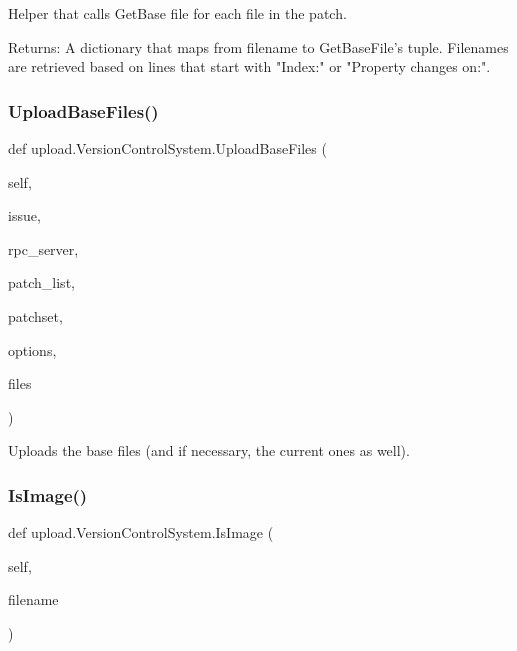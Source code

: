 \begin{DoxyVerb}Helper that calls GetBase file for each file in the patch.

Returns:
  A dictionary that maps from filename to GetBaseFile's tuple.  Filenames
  are retrieved based on lines that start with "Index:" or
  "Property changes on:".
\end{DoxyVerb}
 \mbox{\label{classupload_1_1_version_control_system_a7e334f967301b9e85e5a9c39f5036823}} 
\subsubsection{\texorpdfstring{Upload\+Base\+Files()}{UploadBaseFiles()}}
{\footnotesize\ttfamily def upload.\+Version\+Control\+System.\+Upload\+Base\+Files (\begin{DoxyParamCaption}\item[{}]{self,  }\item[{}]{issue,  }\item[{}]{rpc\+\_\+server,  }\item[{}]{patch\+\_\+list,  }\item[{}]{patchset,  }\item[{}]{options,  }\item[{}]{files }\end{DoxyParamCaption})}

\begin{DoxyVerb}Uploads the base files (and if necessary, the current ones as well).\end{DoxyVerb}
 \mbox{\label{classupload_1_1_version_control_system_a846889ecd2ef40870b456ddb5b349e02}} 
\subsubsection{\texorpdfstring{Is\+Image()}{IsImage()}}
{\footnotesize\ttfamily def upload.\+Version\+Control\+System.\+Is\+Image (\begin{DoxyParamCaption}\item[{}]{self,  }\item[{}]{filename }\end{DoxyParamCaption})}

